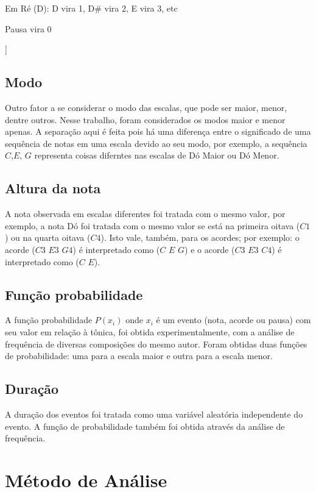 Em Ré (D): D vira 1, D\# vira 2, E vira 3, etc

Pausa vira 0

]

\subsection{Modo}

Outro fator a se considerar o modo das escalas, que pode ser maior, menor, dentre outros. Nesse trabalho, foram considerados os modos maior e menor apenas. A separação aqui é feita pois há uma diferença entre o significado de uma sequência de notas em uma escala devido ao seu modo, por exemplo, a sequência $C$,$E$, $G$ representa coisas diferntes nas escalas de Dó Maior ou Dó Menor.

\subsection{Altura da nota}

A nota observada em escalas diferentes foi tratada com o mesmo valor, por exemplo, a nota Dó foi tratada com o mesmo valor se está na primeira oitava ($C1$) ou na quarta oitava ($C4$). Isto vale, também, para os acordes; por exemplo: o acorde ($C3$ $E3$ $G4$) é interpretado como ($C$ $E$ $G$) e o acorde ($C3$ $E3$ $C4$) é interpretado como ($C$ $E$).

\subsection{Função probabilidade}

A função probabilidade $P(x_i)$ onde $x_i$ é um evento (nota, acorde ou pausa) com seu valor em relação à tônica, foi obtida experimentalmente, com a análise de frequência de diversas composições do mesmo autor. Foram obtidas duas funções de probabilidade: uma para a escala maior e outra para a escala menor.

\subsection{Duração}

A duração dos eventos foi tratada como uma variável aleatória independente do evento. A função de probabilidade também foi obtida através da análise de frequência.

\section{Método de Análise}
